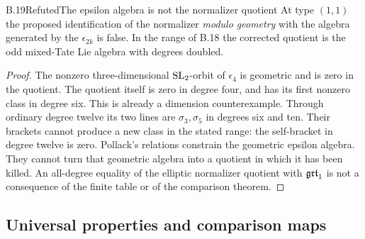 \begin{statement}{B.19}{Refuted}{The epsilon algebra is not the normalizer quotient}
At type $(1,1)$ the proposed identification of the
normalizer \emph{modulo geometry} with the algebra
generated by the $\epsilon_{2k}$ is false. In the
range of B.18 the corrected quotient is the odd
mixed-Tate Lie algebra with degrees doubled.
\end{statement}
\begin{proof}
The nonzero three-dimensional $\operatorname{SL}_2$-orbit of
$\epsilon_4$ is geometric and is zero in the
quotient. The quotient itself is zero in degree
four, and has its first nonzero class in degree six.
This is already a dimension counterexample.
Through ordinary degree twelve its two lines
are $\sigma_3,\sigma_5$ in degrees six and ten.
Their brackets cannot produce a new class in the
stated range: the self-bracket in degree twelve is
zero. Pollack's relations constrain the geometric
epsilon algebra. They cannot turn that geometric
algebra into a quotient in which it has been killed.
An all-degree equality of the elliptic normalizer
quotient with $\mathfrak{grt}_1$ is not a consequence of the
finite table or of the comparison theorem.
\end{proof}

\subsection{Universal properties and comparison maps}

